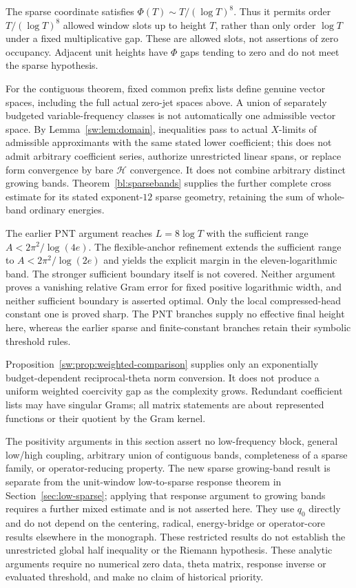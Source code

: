 \documentclass[11pt,a4paper]{article}
\numberwithin{equation}{section}
\theoremstyle{definition}\newtheorem{definition}[theorem]{Definition}
\theoremstyle{remark}\newtheorem{remark}[theorem]{Remark}
\begin{document}
The sparse coordinate satisfies $\Phi(T)\sim T/(\log T)^8$. Thus it permits order $T/(\log T)^8$ allowed window slots up to height $T$, rather than only order $\log T$ under a fixed multiplicative gap. These are allowed slots, not assertions of zero occupancy. Adjacent unit heights have $\Phi$ gaps tending to zero and do not meet the sparse hypothesis.

For the contiguous theorem, fixed common prefix lists define genuine vector spaces, including the full actual zero-jet spaces above. A union of separately budgeted variable-frequency classes is not automatically one admissible vector space. By Lemma~\ref{sw:lem:domain}, inequalities pass to actual $X$-limits of admissible approximants with the same stated lower coefficient; this does not admit arbitrary coefficient series, authorize unrestricted linear spans, or replace form convergence by bare $\mathcal H$ convergence. It does not combine arbitrary distinct growing bands. Theorem~\ref{bl:sparsebands} supplies the further complete cross estimate for its stated exponent-$12$ sparse geometry, retaining the sum of whole-band ordinary energies.

The earlier PNT argument reaches $L=8\log T$ with the sufficient range $A<2\pi^2/\log(4e)$. The flexible-anchor refinement extends the sufficient range to $A<2\pi^2/\log(2e)$ and yields the explicit margin in the eleven-logarithmic band. The stronger sufficient boundary itself is not covered. Neither argument proves a vanishing relative Gram error for fixed positive logarithmic width, and neither sufficient boundary is asserted optimal. Only the local compressed-head constant one is proved sharp. The PNT branches supply no effective final height here, whereas the earlier sparse and finite-constant branches retain their symbolic threshold rules.

Proposition~\ref{sw:prop:weighted-comparison} supplies only an exponentially budget-dependent reciprocal-theta norm conversion. It does not produce a uniform weighted coercivity gap as the complexity grows. Redundant coefficient lists may have singular Grams; all matrix statements are about represented functions or their quotient by the Gram kernel.

The positivity arguments in this section assert no low-frequency block, general low/high coupling, arbitrary union of contiguous bands, completeness of a sparse family, or operator-reducing property. The new sparse growing-band result is separate from the unit-window low-to-sparse response theorem in Section~\ref{sec:low-sparse}; applying that response argument to growing bands requires a further mixed estimate and is not asserted here. They use $q_0$ directly and do not depend on the centering, radical, energy-bridge or operator-core results elsewhere in the monograph. These restricted results do not establish the unrestricted global half inequality or the Riemann hypothesis. These analytic arguments require no numerical zero data, theta matrix, response inverse or evaluated threshold, and make no claim of historical priority.
\end{document}
